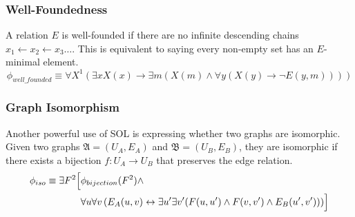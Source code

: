 \documentclass{article}
\begin{document}
\subsubsection{Well-Foundedness}A relation $E$ is well-founded if there are no infinite descending chains $x_1 \leftarrow x_2 \leftarrow x_3 \dots$. This is equivalent to saying every non-empty set has an $E$-minimal element.$$\phi_{well\_founded} \equiv \forall X^1 (\exists x X(x) \rightarrow \exists m (X(m) \land \forall y (X(y) \rightarrow \neg E(y, m))))$$

\subsubsection{Graph Isomorphism}Another powerful use of SOL is expressing whether two graphs are isomorphic. Given two graphs $\mathfrak{A} = (U_A, E_A)$ and $\mathfrak{B} = (U_B, E_B)$, they are isomorphic if there exists a bijection $f: U_A \to U_B$ that preserves the edge relation.$$\begin{aligned}\phi_{iso} \equiv \exists F^2 \Bigl[&\phi_{bijection}(F^2) \land \\
    & \forall u \forall v \left( E_A(u, v) \leftrightarrow \exists u' \exists v' (F(u, u') \land F(v, v') \land E_B(u', v')) \right) \Bigr]\end{aligned}$$
\end{document}
